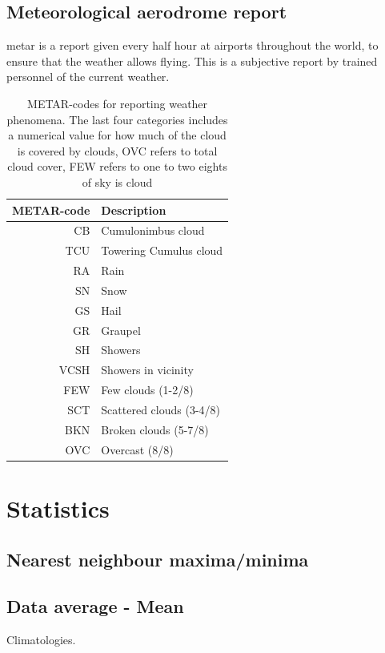 \subsection{Meteorological aerodrome report}\label{sec:metar}
\acrlong{metar} is a report given every half hour at airports throughout the world, to ensure that the weather allows flying. This is a subjective report by trained personnel of the current weather. 

\begin{table}
    \centering
    \begin{tabular}{r|l}
        METAR-code & Description \\
        \hline
        CB & Cumulonimbus cloud \\
        TCU & Towering Cumulus cloud\\
        RA & Rain \\
        SN & Snow  \\
        GS & Hail \\
        GR & Graupel \\
        SH & Showers    \\
        VCSH & Showers in vicinity \\
        FEW & Few clouds (1-2/8)\\
        SCT & Scattered clouds (3-4/8)\\
        BKN & Broken clouds (5-7/8)\\
        OVC & Overcast (8/8)\\
    \end{tabular}
    \caption{METAR-codes for reporting weather phenomena. The last four categories includes a numerical value for how much of the cloud is covered by clouds, OVC refers to total cloud cover, FEW refers to one to two eights of sky is cloud }
    \label{tab:METAR-table}
\end{table}

\section{Statistics}\label{sec:statistics}

\subsection{Nearest neighbour maxima/minima}\label{sec:nearestneigh}

\subsection{Data average - Mean}\label{sec:mean}
Climatologies.


